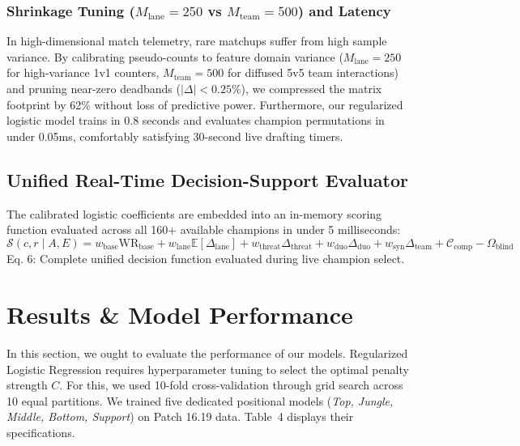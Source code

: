\documentclass[11pt,letterpaper]{article}
\begin{document}
\subsubsection{Shrinkage Tuning ($M_{\text{lane}}=250$ vs $M_{\text{team}}=500$) and Latency}

In high-dimensional match telemetry, rare matchups suffer from high sample variance. By calibrating pseudo-counts to feature domain variance ($M_{\text{lane}}=250$ for high-variance 1v1 counters, $M_{\text{team}}=500$ for diffused 5v5 team interactions) and pruning near-zero deadbands ($|\Delta| < 0.25\%$), we compressed the matrix footprint by 62\% without loss of predictive power. Furthermore, our regularized logistic model trains in 0.8 seconds and evaluates champion permutations in under 0.05ms, comfortably satisfying 30-second live drafting timers.

\subsection{Unified Real-Time Decision-Support Evaluator}

The calibrated logistic coefficients are embedded into an in-memory scoring function evaluated across all 160+ available champions in under 5 milliseconds:
\vspace{-0.3em}
\begin{equation}
\mathcal{S}(c, r \mid A, E) = w_{\text{base}} \text{WR}_{\text{base}} + w_{\text{lane}} \mathbb{E}[\Delta_{\text{lane}}] + w_{\text{threat}} \Delta_{\text{threat}} + w_{\text{duo}} \Delta_{\text{duo}} + w_{\text{syn}} \Delta_{\text{team}} + \mathcal{C}_{\text{comp}} - \Omega_{\text{blind}}
\end{equation}
\vspace{-0.3em}
Eq. 6: Complete unified decision function evaluated during live champion select.

\clearpage

\enlargethispage{2.5\baselineskip}
\section{Results \& Model Performance}

In this section, we ought to evaluate the performance of our models. Regularized Logistic Regression requires hyperparameter tuning to select the optimal penalty strength $C$. For this, we used 10-fold cross-validation through grid search across 10 equal partitions. We trained five dedicated positional models (\textit{Top, Jungle, Middle, Bottom, Support}) on Patch 16.19 data. Table~4 displays their specifications.
\end{document}
